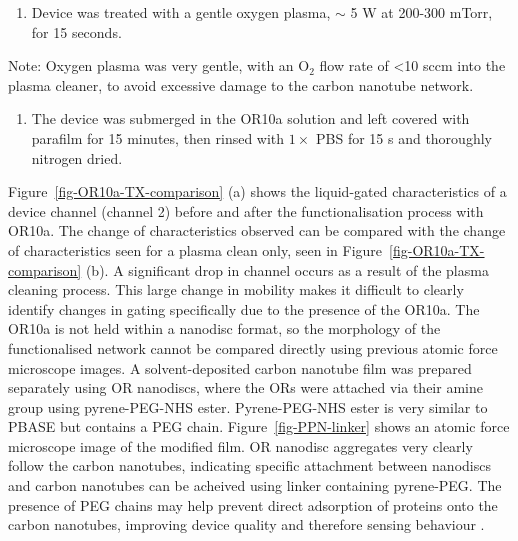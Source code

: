 \documentclass[
  a4paper,
]{scrbook}
\providecommand{\tightlist}{%
  \setlength{\itemsep}{0pt}\setlength{\parskip}{0pt}}\usepackage{longtable,booktabs,array}
\begin{document}
\begin{enumerate}
\def\labelenumi{\arabic{enumi}.}
\setcounter{enumi}{3}
\tightlist
\item
  Device was treated with a gentle oxygen plasma, \(\sim\) 5 W at
  200-300 mTorr, for 15 seconds.
\end{enumerate}

Note: Oxygen plasma was very gentle, with an O\(_2\) flow rate of
\textless10 sccm into the plasma cleaner, to avoid excessive damage to
the carbon nanotube network.

\begin{enumerate}
\def\labelenumi{\arabic{enumi}.}
\setcounter{enumi}{4}
\tightlist
\item
  The device was submerged in the OR10a solution and left covered with
  parafilm for 15 minutes, then rinsed with \(1 \times\) PBS for 15 s
  and thoroughly nitrogen dried.
\end{enumerate}

Figure~\ref{fig-OR10a-TX-comparison} (a) shows the liquid-gated
characteristics of a device channel (channel 2) before and after the
functionalisation process with OR10a. The change of characteristics
observed can be compared with the change of characteristics seen for a
plasma clean only, seen in Figure~\ref{fig-OR10a-TX-comparison} (b). A
significant drop in channel occurs as a result of the plasma cleaning
process. This large change in mobility makes it difficult to clearly
identify changes in gating specifically due to the presence of the
OR10a. The OR10a is not held within a nanodisc format, so the morphology
of the functionalised network cannot be compared directly using previous
atomic force microscope images. A solvent-deposited carbon nanotube film
was prepared separately using OR nanodiscs, where the ORs were attached
via their amine group using pyrene-PEG-NHS ester. Pyrene-PEG-NHS ester
is very similar to PBASE but contains a PEG chain.
Figure~\ref{fig-PPN-linker} shows an atomic force microscope image of
the modified film. OR nanodisc aggregates very clearly follow the carbon
nanotubes, indicating specific attachment between nanodiscs and carbon
nanotubes can be acheived using linker containing pyrene-PEG. The
presence of PEG chains may help prevent direct adsorption of proteins
onto the carbon nanotubes, improving device quality and therefore
sensing behaviour \autocite{Star2003a,Chen2004}.
\end{document}
